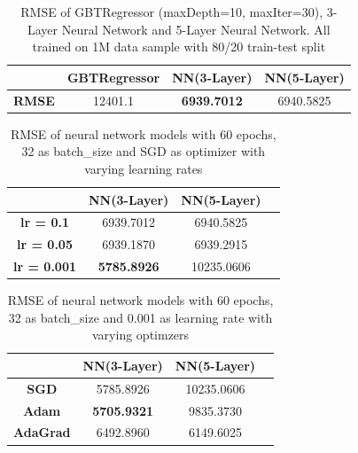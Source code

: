 \documentclass[10pt,twocolumn,letterpaper]{article}
\begin{document}
\begin{table}[t!]
\small
\begin{center}
\begin{tabular}{|c|c|c|c|}
\hline
     & \textbf{GBTRegressor} & \textbf{NN(3-Layer)} & \textbf{NN(5-Layer)}\\ \hline
\textbf{RMSE} & 12401.1     & \textbf{6939.7012}  &  6940.5825                     \\ \hline
\end{tabular}
\end{center}
\caption{ RMSE of GBTRegressor (maxDepth=10, maxIter=30), 3-Layer Neural Network and 5-Layer Neural Network. All trained on 1M data sample with 80/20 train-test split}
\end{table}

\begin{table}[t!]
\small
\begin{center}
\begin{tabular}{|c|c|c|c|}
\hline
     & \textbf{NN(3-Layer)} & \textbf{NN(5-Layer)} \\ \hline
\textbf{lr = 0.1} & 6939.7012 & 6940.5825     \\ \hline
\textbf{lr = 0.05} & 6939.1870 & 6939.2915     \\ \hline
\textbf{lr = 0.001} & \textbf{5785.8926} & 10235.0606     \\ \hline
\end{tabular}
\end{center}
\caption{RMSE of neural network models with 60 epochs, 32 as batch\_size and SGD as optimizer with varying learning rates}
\end{table}

\begin{table}[t!]
\small
\begin{center}
\begin{tabular}{|c|c|c|c|}
\hline
     & \textbf{NN(3-Layer)} & \textbf{NN(5-Layer)} \\ \hline
\textbf{SGD} & 5785.8926 & 10235.0606 \\ \hline
\textbf{Adam} & \textbf{5705.9321} & 9835.3730 \\ \hline
\textbf{AdaGrad} & 6492.8960 & 6149.6025 \\ \hline
\end{tabular}
\end{center}
\caption{RMSE of neural network models with 60 epochs, 32 as batch\_size and 0.001 as learning rate with varying optimzers}
\end{table}
\end{document}
